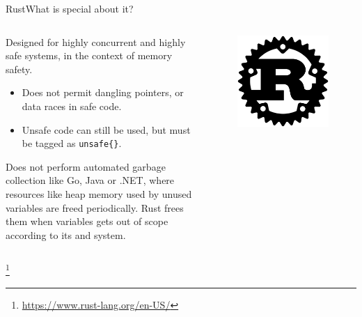 \documentclass[
  aspectratio=169,
]{beamer}
\begin{document}
\begin{frame}{Rust}{What is special about it?}
\begin{columns}[T] %
\begin{column}{.8\textwidth}
Designed for highly concurrent and highly safe systems, in the context of memory safety.
\begin{itemize}
  \item Does not permit \alert{dangling pointers}, or \alert{data races} in safe code.
  \item Unsafe code can still be used, but must be tagged as \texttt{unsafe\{\}}.
\end{itemize}
Does not perform automated \alert{garbage collection} like Go, Java or .NET, where resources like heap memory used by unused variables are freed periodically. Rust frees them when variables gets out of scope according to its  and  system. 
\end{column}%
\begin{column}{.2\textwidth}
\vspace{-0mm}
\begin{figure}
\includegraphics[width=1\textwidth,height=1\textheight,keepaspectratio]{rust.png}
\end{figure}
\end{column}%
\end{columns}
\footnote{\url{https://www.rust-lang.org/en-US/}}
\end{frame}
\end{document}
